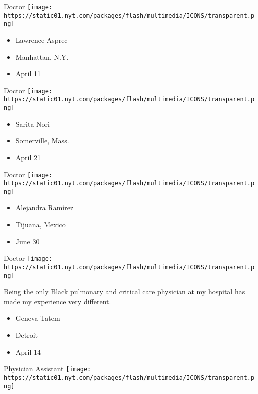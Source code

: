 \protect\hyperlink{item-lawrence-asprec}{}

Doctor
\texttt{[image: https://static01.nyt.com/packages/flash/multimedia/ICONS/transparent.png]}

\begin{itemize}
\tightlist
\item
  Lawrence Asprec
\item
  Manhattan, N.Y.
\item
  April 11
\end{itemize}

\protect\hyperlink{item-sarita-nori}{}

Doctor
\texttt{[image: https://static01.nyt.com/packages/flash/multimedia/ICONS/transparent.png]}

\begin{itemize}
\tightlist
\item
  Sarita Nori
\item
  Somerville, Mass.
\item
  April 21
\end{itemize}

\protect\hyperlink{item-alejandra-ramirez}{}

Doctor
\texttt{[image: https://static01.nyt.com/packages/flash/multimedia/ICONS/transparent.png]}

\begin{itemize}
\tightlist
\item
  Alejandra Ramírez
\item
  Tijuana, Mexico
\item
  June 30
\end{itemize}

\protect\hyperlink{item-geneva-tatem}{}

Doctor
\texttt{[image: https://static01.nyt.com/packages/flash/multimedia/ICONS/transparent.png]}

Being the only Black pulmonary and critical care physician at my
hospital has made my experience very different.

\begin{itemize}
\tightlist
\item
  Geneva Tatem
\item
  Detroit
\item
  April 14
\end{itemize}

\protect\hyperlink{item-natasha-raziuddin}{}

Physician Assistant
\texttt{[image: https://static01.nyt.com/packages/flash/multimedia/ICONS/transparent.png]}

